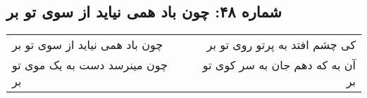 \begin{center}
\section*{شماره ۴۸: چون باد همی نیاید از سوی تو بر}
\label{sec:048}
\begin{longtable}{l p{0.5cm} r}
چون باد همی نیاید از سوی تو بر
&&
کی چشم افتد به پرتو روی تو بر
\\
چون مینرسد دست به یک موی تو بر
&&
آن به که دهم جان به سر کوی تو بر
\\
\end{longtable}
\end{center}
